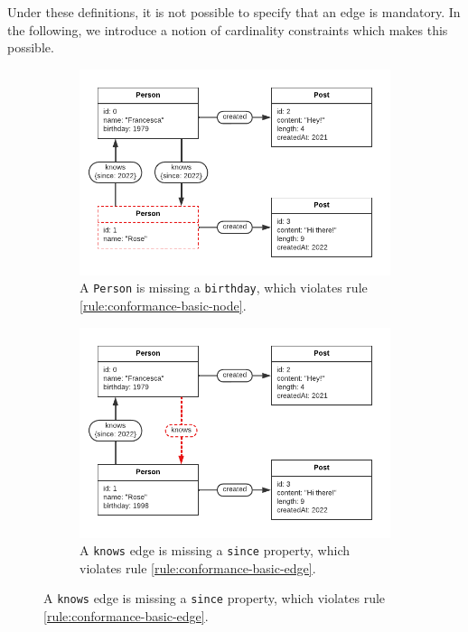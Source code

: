 \documentclass{article}
\theoremstyle{definition}
\begin{document}
Under these definitions, it is not possible to specify that an edge is mandatory. In the following, we introduce a notion of cardinality constraints which makes this possible.

\begin{figure}[t]
  \centering
  \begin{subfigure}[t]{0.45\textwidth}
    \centering
    \includegraphics[width=\textwidth]{figures/conformance-basic-node.pdf}
    \caption{A \texttt{Person} is missing a \texttt{birthday}, which violates rule \ref{rule:conformance-basic-node}.}
    \label{fig:conformance-basic-node}
  \end{subfigure}
  \hfill
  \begin{subfigure}[t]{0.45\textwidth}
    \centering
    \includegraphics[width=\textwidth]{figures/conformance-basic-edge.pdf}
    \caption{A \texttt{knows} edge is missing a \texttt{since} property, which violates rule \ref{rule:conformance-basic-edge}.}
    \label{fig:conformance-basic-edge}
  \end{subfigure}


\end{figure}
\end{document}
